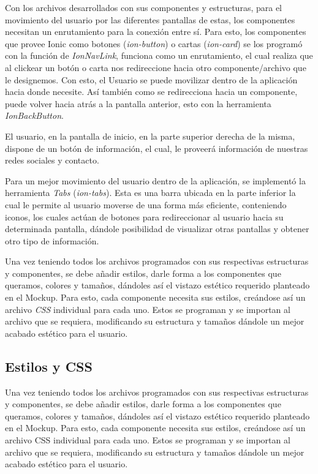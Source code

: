                     Con los archivos desarrollados con sus componentes y estructuras, para el movimiento del usuario por las diferentes pantallas de estas, los componentes necesitan un enrutamiento para la conexión entre sí. Para esto, los componentes que provee Ionic como botones (\textit{ion-button}) o cartas (\textit{ion-card}) se los programó con la función de \textit{IonNavLink}, funciona como un enrutamiento, el cual realiza que al clickear un botón o carta nos redireccione hacia otro componente/archivo que le designemos. Con esto, el Usuario se puede movilizar dentro de la aplicación hacia donde necesite. Así también como se redirecciona hacia un componente, puede volver hacia atrás a la pantalla anterior, esto con la herramienta \textit{IonBackButton}.\par
                        
                    El usuario, en la pantalla de inicio, en la parte superior derecha de la misma, dispone de un botón de información, el cual, le proveerá información de nuestras redes sociales y contacto.\par
                    Para un mejor movimiento del usuario dentro de la aplicación, se implementó la herramienta \textit{Tabs} (\textit{ion-tabs}). Esta es una barra ubicada en la parte inferior la cual le permite al usuario moverse de una forma más eficiente, conteniendo iconos, los cuales actúan de botones para redireccionar al usuario hacia su determinada pantalla, dándole posibilidad de visualizar otras pantallas y obtener otro tipo de información.\par
                    Una vez teniendo todos los archivos programados con sus respectivas estructuras y componentes, se debe añadir estilos, darle forma a los componentes que queramos, colores y tamaños, dándoles así el vistazo estético requerido planteado en el Mockup. Para esto, cada componente necesita sus estilos, creándose así un archivo \textit{CSS} individual para cada uno. Estos se programan y se importan al archivo que se requiera, modificando su estructura y tamaños dándole un mejor acabado estético para el usuario.\par
                
            \subsection{Estilos y CSS}
                Una vez teniendo todos los archivos programados con sus respectivas estructuras y componentes, se debe añadir estilos, darle forma a los componentes que queramos, colores y tamaños, dándoles así el vistazo estético requerido planteado en el Mockup. Para esto, cada componente necesita sus estilos, creándose así un archivo CSS individual para cada uno. Estos se programan y se importan al archivo que se requiera, modificando su estructura y tamaños dándole un mejor acabado estético para el usuario.\par
                
